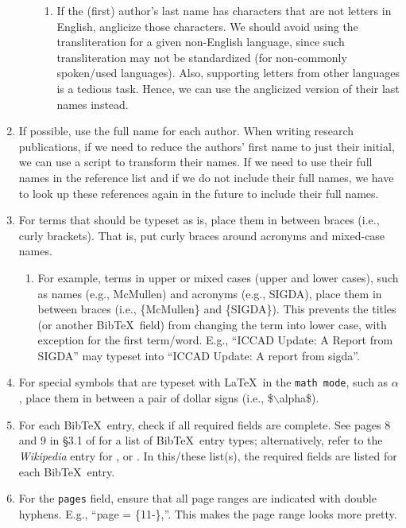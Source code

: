 \documentclass[letter,12pt]{article}
\begin{document}
\begin{enumerate}
\begin{enumerate}
\begin{enumerate}
		\item If the (first) author's last name has characters that are not letters in English, anglicize those characters. We should avoid using the transliteration for a given non-English language, since such transliteration may not be standardized (for non-commonly spoken/used languages). Also, supporting letters from other languages is a tedious task. Hence, we can use the anglicized version of their last names instead.
		\end{enumerate}
	\end{enumerate}
\item If possible, use the full name for each author. When writing research publications, if we need to reduce the authors' first name to just their initial, we can use a script to transform their names. If we need to use their full names in the reference list and if we do not include their full names, we have to look up these references again in the future to include their full names.
\item For terms that should be typeset as is, place them in between braces (i.e., curly brackets). That is, put curly braces around acronyms and mixed-case names. \vspace{-0.3cm}
	\begin{enumerate} \itemsep -2pt
	\item For example, terms in upper or mixed cases (upper and lower cases), such as names (e.g., McMullen) and acronyms (e.g., SIGDA), place them in between braces (i.e., \{McMullen\} and \{SIGDA\}). This prevents the titles (or another {\sc Bib}\TeX\ field) from changing the term into lower case, with exception for the first term/word. E.g., ``ICCAD Update: A Report from SIGDA'' may typeset into ``ICCAD Update: A report from sigda''.
	\end{enumerate}
\item For special symbols that are typeset with \LaTeX\ in the {\tt math mode}, such as $\alpha$, place them in between a pair of dollar signs (i.e., \$$\backslash$alpha\$).
\item For each {\sc Bib}\TeX\ entry, check if all required fields are complete. See pages 8 and 9 in \S3.1 of \cite{Patashnik1988} for a list of {\sc Bib}\TeX\ entry types; alternatively, refer to the {\it Wikipedia} entry for , or \cite[\S12.2.1, pp. 230--231]{Kopka2004}. In this/these list(s), the required fields are listed for each {\sc Bib}\TeX\ entry.
\item For the {\tt pages} field, ensure that all page ranges are indicated with double hyphens. E.g., ``page = \{11-\},''. This makes the page range looks more pretty.

\end{enumerate}
\end{document}
